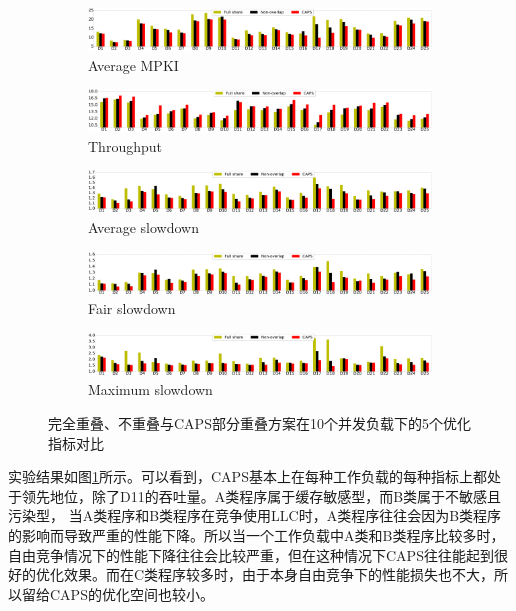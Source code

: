 \begin{figure}[htbp] 
    \centering
    \begin{subfigure}[b]{1\linewidth}
        \centering\includegraphics[width=0.95\linewidth]{figures/d20_miss.pdf}
        \caption{Average MPKI}
    \end{subfigure}
    \begin{subfigure}[b]{1\linewidth}
        \centering\includegraphics[width=0.95\linewidth]{figures/d20_ipc.pdf}
        \caption{Throughput}
    \end{subfigure}
    \begin{subfigure}[b]{1\linewidth}
        \centering\includegraphics[width=0.95\linewidth]{figures/d20_ws.pdf}
        \caption{Average slowdown}
    \end{subfigure}
    \begin{subfigure}[b]{1\linewidth}
        \centering\includegraphics[width=0.95\linewidth]{figures/d20_fs.pdf}
        \caption{Fair slowdown}
    \end{subfigure}
    \begin{subfigure}[b]{1\linewidth}
        \centering\includegraphics[width=0.95\linewidth]{figures/d20_ms.pdf}
        \caption{Maximum slowdown}
    \end{subfigure}
    \caption{完全重叠、不重叠与CAPS部分重叠方案在10个并发负载下的5个优化指标对比}
    \label{fig:10w}
\end{figure}

实验结果如图\ref{fig:10w}所示。可以看到，CAPS基本上在每种工作负载的每种指标上都处于领先地位，除了D11的吞吐量。A类程序属于缓存敏感型，而B类属于不敏感且污染型， 当A类程序和B类程序在竞争使用LLC时，A类程序往往会因为B类程序的影响而导致严重的性能下降。所以当一个工作负载中A类和B类程序比较多时，自由竞争情况下的性能下降往往会比较严重，但在这种情况下CAPS往往能起到很好的优化效果。而在C类程序较多时，由于本身自由竞争下的性能损失也不大，所以留给CAPS的优化空间也较小。

